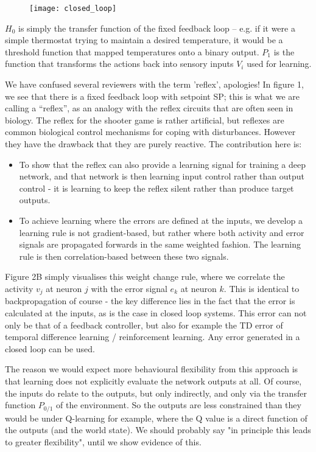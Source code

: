 \documentclass{article}
\begin{document}
	

\begin{figure}[!ht]
	\centering
	\texttt{[image: closed\_loop]}
	\caption{
		\label{closed_loop}}
\end{figure}

	
	$H_{0}$ is simply the transfer function of the fixed feedback loop – e.g. if it were a simple thermostat trying to maintain a desired temperature, it would be a threshold function that mapped temperatures onto a binary output. $P_{1}$ is the function that transforms the actions back into sensory inputs $V_{i}$ used for learning. 
	

		
	We have confused several reviewers with the term 'reflex', apologies! In figure 1, we see that there is a fixed feedback loop with setpoint SP; this is what we are calling a ``reflex'', as an analogy with the reflex circuits that are often seen in biology. The reflex for the shooter game is rather artificial, but reflexes are common biological control mechanisms for coping with disturbances. However they have the drawback that they are purely reactive. The contribution here is:
	\begin{itemize}
		\item To show that the reflex can also provide a learning signal for training a deep network, and that network is then learning input control rather than output control - it is learning to keep the reflex silent rather than produce target outputs.
		\item To achieve learning where the errors are defined at the inputs, we develop a learning rule is not gradient-based, but rather where both activity and error signals are propagated forwards in the same weighted fashion. The learning rule is then correlation-based between these two signals.
	\end{itemize}
	
	
		Figure 2B simply visualises this weight change rule, where we correlate the activity $v_{j}$ at neuron $j$ with the error signal $e_{k}$ at neuron $k$. This is identical to backpropagation of course - the key difference lies in the fact that the error is calculated at the inputs, as is the case in closed loop systems. This error can not only be that of a feedback controller, but also for example the TD error of temporal difference learning / reinforcement learning. Any error generated in a closed loop can be used.
		
		
		
	The reason we would expect more behavioural flexibility from this approach is that learning does not explicitly evaluate the network outputs at all. Of course, the inputs do relate to the outputs, but only indirectly, and only via the transfer function $P_{0/1}$ of the environment. So the outputs are less constrained than they would be under Q-learning for example, where the Q value is a direct function of the outputs (and the world state). We should probably say "in principle this leads to greater flexibility", until we show evidence of this. 
	
\end{document}
